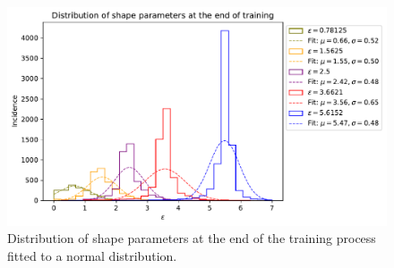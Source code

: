 \documentclass[12pt]{report} %
\begin{document}
\begin{figure}[h]
  \includegraphics[width=\textwidth]{imagenes/experiments/1d/ode/distribution_of_shape_parameters_at_end_of_training.pdf}
  \caption{Distribution of shape parameters at the end of the training process fitted to a normal distribution.}
  \label{fig:ode-1d-results-shape-parameters}
\end{figure}


\end{document}
